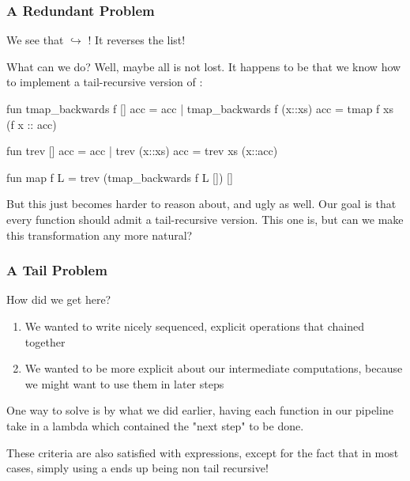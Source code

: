 \documentclass[aspectratio=169]{beamer}
\begin{document}
\begin{frame}[fragile]
  \frametitle{A Redundant Problem}

  We see that  $\hookrightarrow$ 
  \code{["3", "2", "1"]}! It reverses the list!

  What can we do? Well, maybe all is not lost. It happens to be that 
  we know how to implement a tail-recursive version of :

  \begin{codeblock}
    fun tmap_backwards f [] acc = acc
      | tmap_backwards f (x::xs) acc = tmap f xs (f x :: acc) 

    fun trev [] acc = acc
      | trev (x::xs) acc = trev xs (x::acc)

    fun map f L = 
      trev (tmap_backwards f L []) []
  \end{codeblock}

  But this just becomes harder to reason about, and ugly as well. Our goal
  is that every function should admit a tail-recursive version. This one is,
  but can we make this transformation any more natural?
\end{frame}

\begin{frame}[fragile]
  \frametitle{A Tail Problem}

  How did we get here?

  \begin{enumerate}
    \item We wanted to write nicely sequenced, explicit operations that chained together
    \item We wanted to be more explicit about our intermediate computations, because
    we might want to use them in later steps
  \end{enumerate}

  One way to solve is by what we did earlier, having each function in our pipeline 
  take in a lambda which contained the "next step" to be done.

  These criteria are also satisfied with  expressions, except for the  
  fact that in most cases, simply using a  ends up being non
  tail recursive!

\end{frame}

\end{document}
